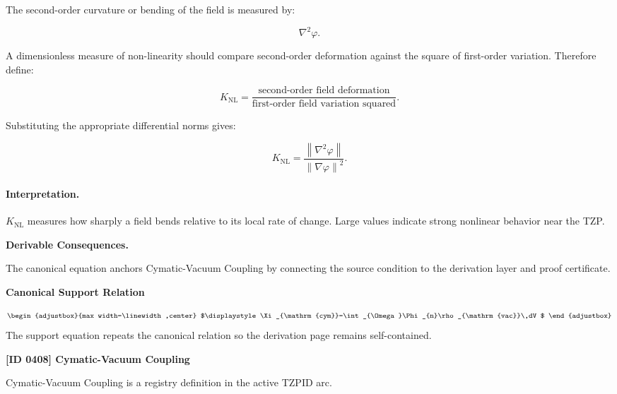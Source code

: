 The second-order curvature or bending of the field is measured by:

\begin{equation}
\nabla^2\varphi .
\end{equation}

A dimensionless measure of non-linearity should compare second-order deformation against the square of first-order variation. Therefore define:

\begin{equation}
K_{\mathrm{NL}}
=
\frac{\text{second-order field deformation}}
{\text{first-order field variation squared}} .
\end{equation}

Substituting the appropriate differential norms gives:

\begin{equation}
\boxed{
K_{\mathrm{NL}}
=
\frac{\left\lVert \nabla^{2}\varphi\right\rVert}
{\left\lVert \nabla\varphi\right\rVert^{2}} .
}
\end{equation}

\paragraph{Interpretation.}
$K_{\mathrm{NL}}$ measures how sharply a field bends relative to its local rate of change. Large values indicate strong nonlinear behavior near the TZP.

\par\vspace{0.35em}
\noindent\textbf{Derivable Consequences.}\quad
\begingroup
\footnotesize
\raggedright
The canonical equation anchors Cymatic-Vacuum Coupling by connecting the source condition to the derivation layer and proof certificate.
\par\endgroup

\noindent\textbf{Canonical Support Relation}\par
\[
\begin{adjustbox}{max width=\linewidth,center}
$\displaystyle
\Xi_{\mathrm{cym}}=\int_{\Omega}\Phi_{n}\rho_{\mathrm{vac}}\,dV
$
\end{adjustbox}
\]
\noindent The support equation repeats the canonical relation so the derivation page remains self-contained.\par

\clearpage
\noindent\textbf{[ID 0408] Cymatic-Vacuum Coupling}\par
\vspace{0.35em}
\begingroup\small
{}
Cymatic-Vacuum Coupling is a registry definition in the active TZPID arc.

